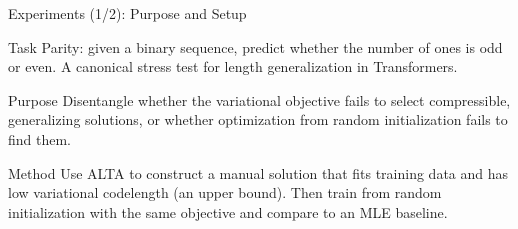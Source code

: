 \documentclass{beamer}
\begin{document}
\begin{frame}{Experiments (1/2): Purpose and Setup}
\small
\begin{block}{Task}
Parity: given a binary sequence, predict whether the number of ones is odd or even. A canonical stress test for length generalization in Transformers.
\end{block}

\begin{block}{Purpose}
Disentangle whether the variational objective fails to select compressible, generalizing solutions, or whether optimization from random initialization fails to find them.
\end{block}

\begin{block}{Method}
Use ALTA to construct a manual solution that fits training data and has low variational codelength (an upper bound). Then train from random initialization with the same objective and compare to an MLE baseline.
\end{block}
\end{frame}
\end{document}
